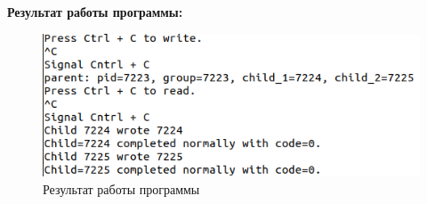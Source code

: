 \documentclass[14pt, a4paper]{extarticle}
\begin{document}
\newpage
\textbf{Результат работы программы:}\par
\begin{figure}[h!]
	\centering
	\includegraphics[width=\textwidth]{source/5.png}
	\caption{Результат работы программы}
	\label{Example5}
\end{figure}\par
\end{document}

